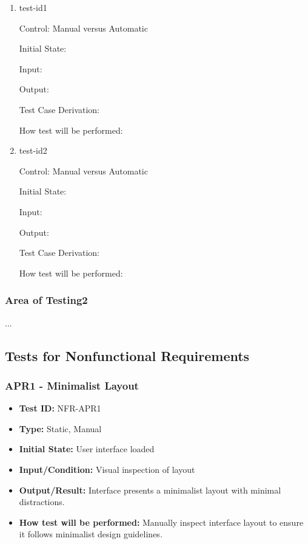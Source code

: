 \documentclass[12pt, titlepage]{article}
\begin{document}
\begin{enumerate}

\item{test-id1\\}

Control: Manual versus Automatic
					
Initial State: 
					
Input: 
					
Output: 

Test Case Derivation: 
					
How test will be performed: 
					
\item{test-id2\\}

Control: Manual versus Automatic
					
Initial State: 
					
Input: 
					
Output: 

Test Case Derivation: 

How test will be performed: 

\end{enumerate}

\subsubsection{Area of Testing2}

...

\subsection{Tests for Nonfunctional Requirements}

\subsubsection{APR1 - Minimalist Layout}
\begin{itemize}
    \item \textbf{Test ID:} NFR-APR1
    \item \textbf{Type:} Static, Manual
    \item \textbf{Initial State:} User interface loaded
    \item \textbf{Input/Condition:} Visual inspection of layout
    \item \textbf{Output/Result:} Interface presents a minimalist layout with minimal distractions.
    \item \textbf{How test will be performed:} Manually inspect interface layout to ensure it follows minimalist design guidelines.
\end{itemize}
\end{document}
